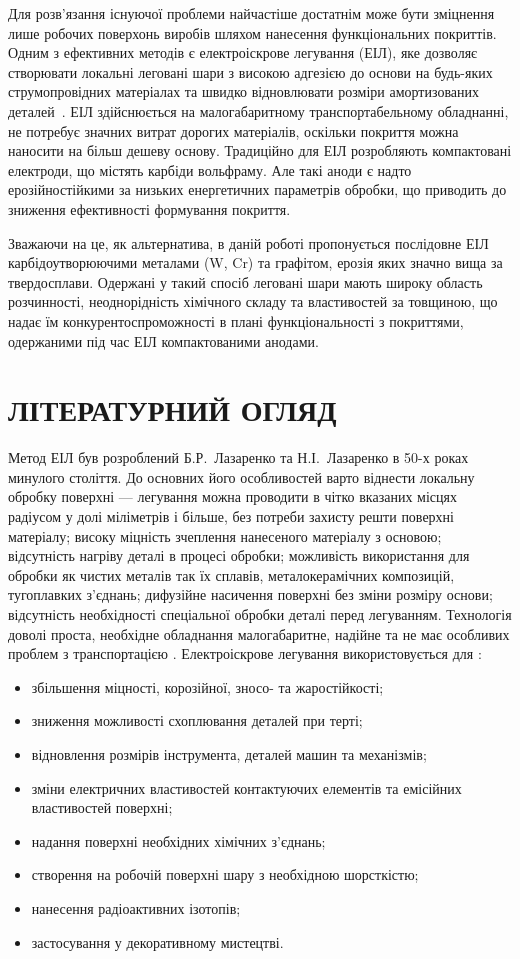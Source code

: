 \documentclass[a4paper,fontsize=14bp,ukrainian]{extreport}
\begin{document}
Для розв'язання існуючої проблеми найчастіше достатнім може бути зміцнення лише робочих поверхонь виробів шляхом нанесення функціональних покриттів. Одним з ефективних методів є електроіскрове легування (ЕІЛ), яке дозволяє створювати локальні леговані шари з високою адгезією до основи на будь-яких струмопровідних матеріалах та швидко відновлювати розміри амортизованих деталей~\cite{hitlevich1985}. ЕІЛ здійснюється на малогабаритному транспортабельному обладнанні, не потребує значних витрат дорогих матеріалів, оскільки покриття можна наносити на більш дешеву основу.
Традиційно для ЕІЛ розробляють компактовані електроди, що містять карбіди вольфраму. Але такі аноди є надто ерозійностійкими за низьких енергетичних параметрів обробки, що приводить до зниження ефективності формування покриття.

Зважаючи на це, як альтернатива, в даній роботі пропонується послідовне ЕІЛ карбідоутворюючими металами (W, Cr) та графітом, ерозія яких значно вища за твердосплави. Одержані у такий спосіб леговані шари мають широку область розчинності, неоднорідність хімічного складу та властивостей за товщиною, що надає їм конкурентоспроможності в плані функціональності з покриттями, одержаними під час ЕІЛ компактованими анодами.

\chapter{ЛІТЕРАТУРНИЙ ОГЛЯД}

Метод ЕІЛ був розроблений Б.Р.~Лазаренко та Н.І.~Лазаренко в 50-х роках минулого століття. До основних його особливостей варто віднести локальну обробку поверхні --- легування  можна проводити в чітко вказаних місцях радіусом у долі міліметрів і більше, без потреби захисту решти поверхні матеріалу; високу міцність зчеплення нанесеного матеріалу з основою; відсутність нагріву деталі в процесі обробки; можливість використання для обробки як чистих металів так їх сплавів, металокерамічних композицій, тугоплавких з'єднань; дифузійне насичення поверхні без зміни розміру основи; відсутність необхідності спеціальної обробки деталі перед легуванням. Технологія доволі проста, необхідне обладнання малогабаритне, надійне та не має особливих проблем з транспортацією \cite{hitlevich1985}.
Електроіскрове легування використовується для \cite{hitlevich1985}: %
\begin{itemize}
\item збільшення міцності, корозійної, зносо- та жаростійкості;
\item зниження можливості схоплювання деталей при терті;
\item відновлення розмірів інструмента, деталей машин та механізмів;
\item зміни електричних властивостей контактуючих елементів та емісійних властивостей поверхні;
\item надання поверхні необхідних хімічних з'єднань;
\item створення на робочій поверхні шару з необхідною шорсткістю;
\item нанесення радіоактивних ізотопів;
\item застосування у декоративному мистецтві.
\end{itemize}
\end{document}
